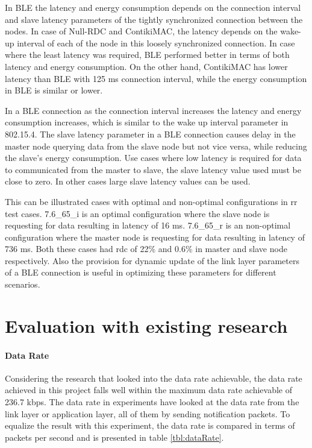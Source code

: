 In BLE the latency and energy consumption depends on the connection interval and slave latency parameters of the tightly synchronized connection between the nodes. In case of Null-RDC and ContikiMAC, the latency depends on the wake-up interval of each of the node in this loosely synchronized connection. In case where the least latency was required, BLE performed better in terms of both latency and energy consumption. On the other hand, ContikiMAC has lower latency than BLE with 125 ms connection interval, while the energy consumption in BLE is similar or lower.

In a BLE connection as the connection interval increases the latency and energy consumption increases, which is similar to the wake up interval parameter in 802.15.4. The slave latency parameter in a BLE connection causes delay in the master node querying data from the slave node but not vice versa, while reducing the slave's energy consumption. Use cases where low latency is required for data to communicated from the master to slave, the slave latency value used must be close to zero. In other cases large slave latency values can be used. 

This can be illustrated cases with optimal and non-optimal configurations in \gls{rr} test cases. 7.6\_65\_i is an optimal configuration where the slave node is requesting for data resulting in latency of 16 ms. 7.6\_65\_r is an non-optimal configuration where the master node is requesting for data resulting in latency of 736 ms. Both these cases had \gls{rdc} of 22\% and 0.6\% in master and slave node respectively. Also the provision for dynamic update of the link layer parameters of a BLE connection is useful in optimizing these parameters for different scenarios.

\section{Evaluation with existing research} \label{7Eval}
\paragraph{Data Rate}
Considering the research that looked into the data rate achievable, the data rate achieved in this project falls well within the maximum data rate achievable\cite{Gomez2011} of 236.7 kbps. The data rate in experiments have looked at the data rate from the link layer\cite{Mikhaylov2013} or application layer\cite{Gomez2012}\cite{Mackensen2012}\cite{Kindt2014}, all of them by sending notification packets. To equalize the result with this experiment, the data rate is compared in terms of packets per second and is presented in table \ref{tbl:dataRate}.

